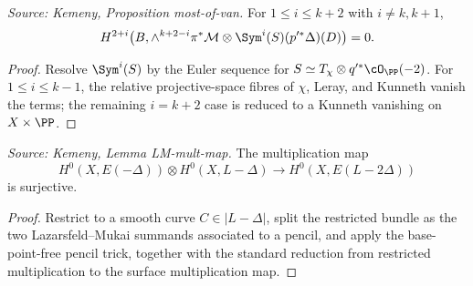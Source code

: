 \begin{proposition}
  \label{prop:kemeny_odd_most_of_vanishing}
  \textit{Source: Kemeny, Proposition most-of-van.}
  For \(1\le i\le k+2\) with \(i\ne k,k+1\),
  \[
    H^{2+i}\bigl(B,\wedge^{k+2-i}\pi^*\mathcal M\otimes
    \Sym^i(S)(p'^*\Delta)(D)\bigr)=0 .
  \]
\end{proposition}
\begin{proof}
  Resolve \(\Sym^i(S)\) by the Euler sequence for \(S\simeq T_\chi\otimes
  q'^*\cO_{\PP}(-2)\).  For \(1\le i\le k-1\), the relative projective-space
  fibres of \(\chi\), Leray, and Kunneth vanish the terms; the remaining
  \(i=k+2\) case is reduced to a Kunneth vanishing on \(X\times\PP\).
\end{proof}

\begin{lemma}
  \label{lem:kemeny_LM_mult_map}
  \textit{Source: Kemeny, Lemma LM-mult-map.}
  The multiplication map
  \[
    H^0(X,E(-\Delta))\otimes H^0(X,L-\Delta)\to H^0(X,E(L-2\Delta))
  \]
  is surjective.
\end{lemma}
\begin{proof}
  Restrict to a smooth curve \(C\in|L-\Delta|\), split the restricted bundle as
  the two Lazarsfeld--Mukai summands associated to a pencil, and apply the
  base-point-free pencil trick, together with the standard reduction from
  restricted multiplication to the surface multiplication map.
\end{proof}

